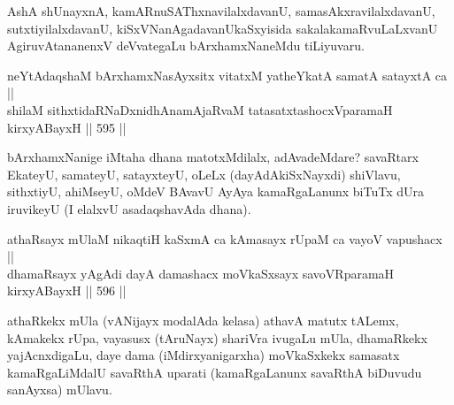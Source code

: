 \begin{artha}
AshA shUnayxnA, kamARnuSAThxnavilalxdavanU, samasAkxravilalxdavanU,
sutxtiyilalxdavanU, kiSxVNanAgadavanUkaSxyisida sakalakamaRvuLaLxvanU
AgiruvAtananenxV deVvategaLu bArxhamxNaneMdu tiLiyuvaru.
\end{artha}


\begin{shl}
neYtAdaqshaM bArxhamxNasAyxsitx vitatxM \footnotemark[1]yatheYkatA samatA satayxtA ca || \\
shilaM sithxtidaRNaDxnidhAnamAjaRvaM tatasatxtashocxVparamaH kirxyABayxH \hfill || 595 ||  
\end{shl}

\begin{artha}
bArxhamxNanige iMtaha dhana matotxMdilalx, adAvadeMdare?
savaRtarx EkateyU, samateyU, satayxteyU, oLeLx (dayAdAkiSxNayxdi)
shiVlavu, sithxtiyU, ahiMseyU, oMdeV BAvavU AyAya kamaRgaLanunx biTuTx
dUra iruvikeyU  (I elalxvU asadaqshavAda dhana).
\end{artha}


\begin{shl}
athaRsayx mUlaM \footnotemark[4]nikaqtiH kaSxmA ca kAmasayx rUpaM ca vayoV vapushacx || \\
dhamaRsayx yAgAdi dayA damashacx moVkaSxsayx savoVRparamaH kirxyABayxH \hfill || 596 ||  
\end{shl}

\begin{artha}
athaRkekx mUla (vANijayx modalAda kelasa) athavA matutx
tALemx, kAmakekx rUpa, vayasusx (tAruNayx) shariVra ivugaLu mUla,
dhamaRkekx yajAcnxdigaLu, daye dama (iMdirxyanigarxha) moVkaSxkekx
samasatx kamaRgaLiMdalU savaRthA uparati (kamaRgaLanunx savaRthA
biDuvudu sanAyxsa) mUlavu.
\end{artha}

